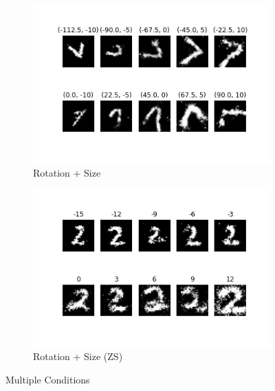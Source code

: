 \documentclass[11pt, letterpaper, oneside]{article}
\begin{document}
\begin{figure}
    \begin{subfigure}{.5\textwidth}
      \centering
      \includegraphics[width=1\linewidth]{rotation_size.png}  
      \caption{Rotation + Size}
      \label{fig:sub-third}
    \end{subfigure}
    \begin{subfigure}{.5\textwidth}
      \centering
      \includegraphics[width=1\linewidth]{size_ZSL.png}
      \caption{Rotation + Size (ZS)}
      \label{fig:sub-fourth}
    \end{subfigure}
    
\caption{Multiple Conditions}
\label{fig:fig}
\end{figure}
\end{document}
